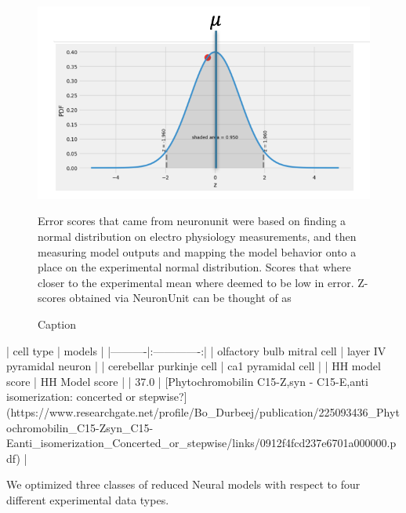 \begin{figure}
	\includegraphics[width=\maxwidth{\textwidth}]{figures/normal_distribution.png}
	\caption{Error scores that came from neuronunit were based on finding a normal distribution on electro physiology measurements, and then measuring model outputs and mapping the model behavior onto a place on the experimental normal distribution. Scores that where closer to the experimental mean where deemed to be low in error.
	Z-scores obtained via NeuronUnit can be thought of as  }
	\label{figure\arabic{figurecounter}}
	
\caption{Caption}
	
\end{figure}

\begin{markdown}
| cell type   |      models      |
|----------|:-------------:|
| olfactory bulb mitral cell | layer IV pyramidal neuron |
| cerebellar purkinje cell | ca1 pyramidal cell |
| HH model score | HH Model score |
| 37.0 | [Phytochromobilin C15-Z,syn - C15-E,anti isomerization: concerted or stepwise?](https://www.researchgate.net/profile/Bo_Durbeej/publication/225093436_Phytochromobilin_C15-Zsyn_C15-Eanti_isomerization_Concerted_or_stepwise/links/0912f4fcd237e6701a000000.pdf) |
\end{markdown}

\begin{table}
\centering
{}
\caption{Caption}
We optimized three classes of reduced Neural models with respect to four different experimental data types.
\end{table}         

